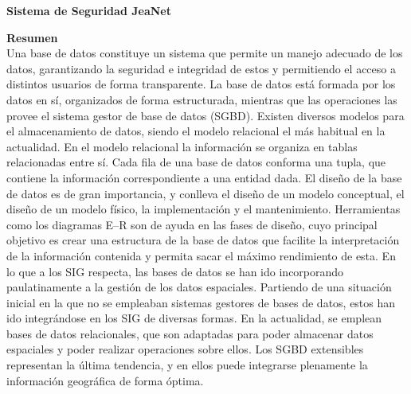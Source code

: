 \documentclass[12pt,letterpaper]{article}
\begin{document}

\newpage
\tableofcontents

\newpage
\begin{LARGE}
    \begin{center}
        \textbf{Sistema de Seguridad JeaNet} \\
    \end{center}
\end{LARGE}
\vspace*{0.1in}
\textbf{Resumen}\\
Una base de datos constituye un sistema que permite un manejo adecuado de los datos, garantizando la seguridad e integridad de estos y permitiendo el acceso a distintos usuarios de forma transparente. La base de datos está formada por los datos en sí, organizados de forma estructurada, mientras que las operaciones las provee el sistema gestor de base de datos (SGBD).
Existen diversos modelos para el almacenamiento de datos, siendo el modelo relacional el más habitual en la actualidad. En el modelo relacional la información se organiza en tablas relacionadas entre sí. Cada fila de una base de datos conforma una tupla, que contiene la información correspondiente a una entidad dada.
El diseño de la base de datos es de gran importancia, y conlleva el diseño de un modelo conceptual, el diseño de un modelo físico, la implementación y el mantenimiento. Herramientas como los diagramas E--R son de ayuda en las fases de diseño, cuyo principal objetivo es crear una estructura de la base de datos que facilite la interpretación de la información contenida y permita sacar el máximo rendimiento de esta.
En lo que a los SIG respecta, las bases de datos se han ido incorporando paulatinamente a la gestión de los datos espaciales. Partiendo de una situación inicial en la que no se empleaban sistemas gestores de bases de datos, estos han ido integrándose en los SIG de diversas formas. En la actualidad, se emplean bases de datos relacionales, que son adaptadas para poder almacenar datos espaciales y poder realizar operaciones sobre ellos. Los SGBD extensibles representan la última tendencia, y en ellos puede integrarse plenamente la información geográfica de forma óptima.
\\
\end{document}
